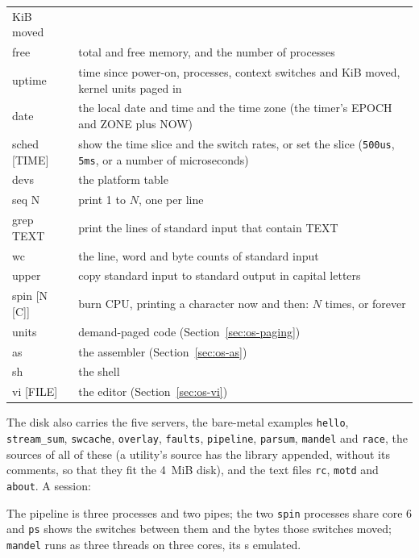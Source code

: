 \begin{table}[htbp]
\begin{tabularx}{\linewidth}{@{}>{\ttfamily}l X@{}}
  KiB moved\\
free & total and free memory, and the number of processes\\
uptime & time since power-on, processes, context switches and KiB moved, kernel units paged in\\
date & the local date and time and the time zone (the timer's EPOCH and ZONE plus NOW)\\
sched [TIME] & show the time slice and the switch rates, or set the slice
  (\texttt{500us}, \texttt{5ms}, or a number of microseconds)\\
devs & the platform table\\
seq N & print 1 to $N$, one per line\\
grep TEXT & print the lines of standard input that contain TEXT\\
wc & the line, word and byte counts of standard input\\
upper & copy standard input to standard output in capital letters\\
spin [N [C]] & burn CPU, printing a character now and then: $N$ times, or forever\\
units & demand-paged code (Section~\ref{sec:os-paging})\\
as & the assembler (Section~\ref{sec:os-as})\\
sh & the shell\\
vi [FILE] & the editor (Section~\ref{sec:os-vi})\\
\bottomrule
\end{tabularx}
\end{table}

The disk also carries the five servers, the bare-metal examples \texttt{hello}, \texttt{stream\_sum},
\texttt{swcache}, \texttt{overlay}, \texttt{faults}, \texttt{pipeline}, \texttt{parsum}, \texttt{mandel}
and \texttt{race}, the sources of all of these (a utility's source has the library appended, without
its comments, so that they fit the 4~MiB disk), and the text files \texttt{rc}, \texttt{motd} and
\texttt{about}. A session:


The pipeline is three processes and two pipes; the two \texttt{spin} processes share core 6 and
\texttt{ps} shows the switches between them and the bytes those switches moved; \texttt{mandel} runs as
three threads on three cores, its s emulated.


